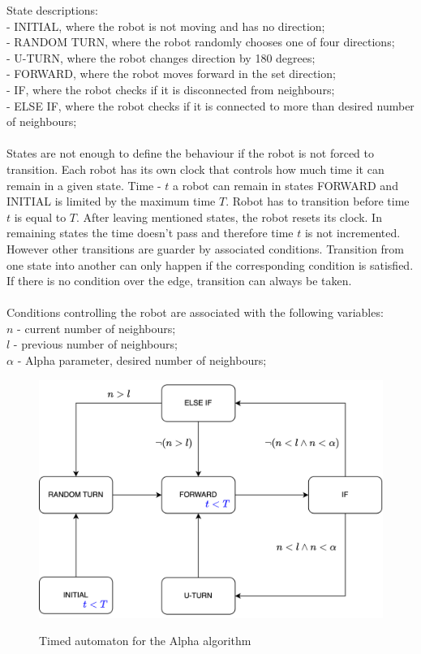 \noindent State descriptions:\\
- INITIAL, where the robot is not moving and has no direction;\\
- RANDOM TURN, where the robot randomly chooses one of four directions;\\
- U-TURN, where the robot changes direction by 180 degrees;\\
- FORWARD, where the robot moves forward in the set direction;\\
- IF, where the robot checks if it is disconnected from neighbours;\\
- ELSE IF, where the robot checks if it is connected to more than desired number of neighbours;\\\\
States are not enough to define the behaviour if the robot is not forced to transition. Each robot has its own clock that controls how much time it can remain in a given state. Time - $t$ a robot can remain in states FORWARD and INITIAL is limited by the maximum time $T$.
Robot has to transition before time $t$ is equal to $T$. After leaving mentioned states, the robot resets its clock. In remaining states the time doesn't pass and therefore time $t$ is not incremented. However other transitions are guarder by associated conditions. Transition from one state into another can only happen if the corresponding condition is satisfied. If there is no condition over the edge, transition can always be taken.\\\\ Conditions controlling the robot are associated with the following variables:\\
$n$ - current number of neighbours;\\
$l$ - previous number of neighbours;\\
$\alpha$ - Alpha parameter, desired number of neighbours;\\
\begin{figure}[H]
\caption{Timed automaton for the Alpha algorithm}
\includegraphics[scale=0.9]{images/automaton.png}
\label{fig:automaton}
\end{figure}